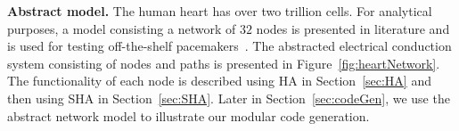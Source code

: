 \noindent \textbf{Abstract model.}
The human heart has over two trillion cells. For analytical purposes, a
model consisting  a network of  $32$ nodes is presented in literature
and is used for testing off-the-shelf pacemakers~\cite{chen14,zhihao12}.
The abstracted electrical conduction system consisting  of 
nodes and paths is presented in Figure~\ref{fig:heartNetwork}.
The functionality of each node is described using \acf{HA} in Section~\ref{sec:HA} and then using \acf{SHA} in Section~\ref{sec:SHA}.
Later in Section~\ref{sec:codeGen}, we use the abstract network model 
to illustrate our modular code generation.

 
